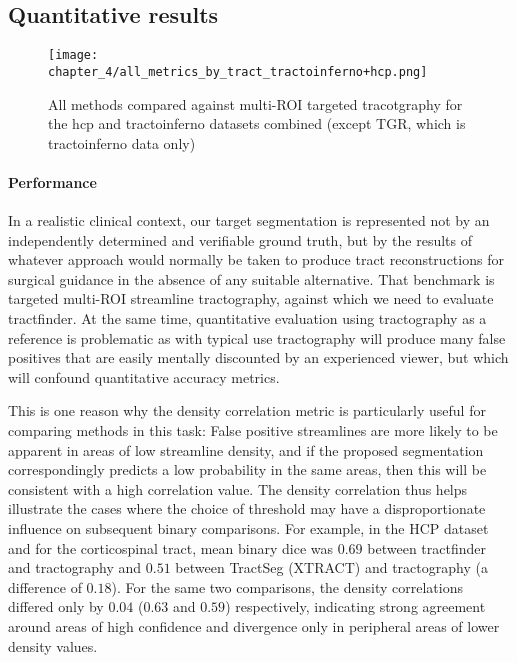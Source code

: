 \subsection{Quantitative results}

\begin{figure}[h!]
  \centering
  \texttt{[image: chapter\_4/all\_metrics\_by\_tract\_tractoinferno+hcp.png]}
  \caption{All methods compared against multi-ROI targeted tracotgraphy for the hcp and tractoinferno datasets combined (except TGR, which is tractoinferno data only)}
  \label{fig:combobox}
\end{figure}

\paragraph*{Performance}

In a realistic clinical context, our target segmentation is represented not by an independently determined and verifiable ground truth, but by the results of whatever approach would normally be taken to produce tract reconstructions for surgical guidance in the absence of any suitable alternative.
That benchmark is targeted multi-ROI streamline tractography, against which we need to evaluate tractfinder.
At the same time, quantitative evaluation using tractography as a reference is problematic as with typical use tractography will produce many false positives that are easily mentally discounted by an experienced viewer, but which will confound quantitative accuracy metrics.


This is one reason why the density correlation metric is particularly useful for comparing methods in this task:
False positive streamlines are more likely to be apparent in areas of low streamline density, and if the proposed segmentation correspondingly predicts a low probability in the same areas, then this will be consistent with a high correlation value.
The density correlation thus helps illustrate the cases where the choice of threshold may have a disproportionate influence on subsequent binary comparisons.
For example, in the HCP dataset and for the corticospinal tract, mean binary \gls{dice} was $0.69$ between tractfinder and tractography and $0.51$ between TractSeg (XTRACT) and tractography (a difference of $0.18$).
For the same two comparisons, the density correlations differed only by $0.04$ ($0.63$ and $0.59$) respectively, indicating strong agreement around areas of high confidence and divergence only in peripheral areas of lower density values.


